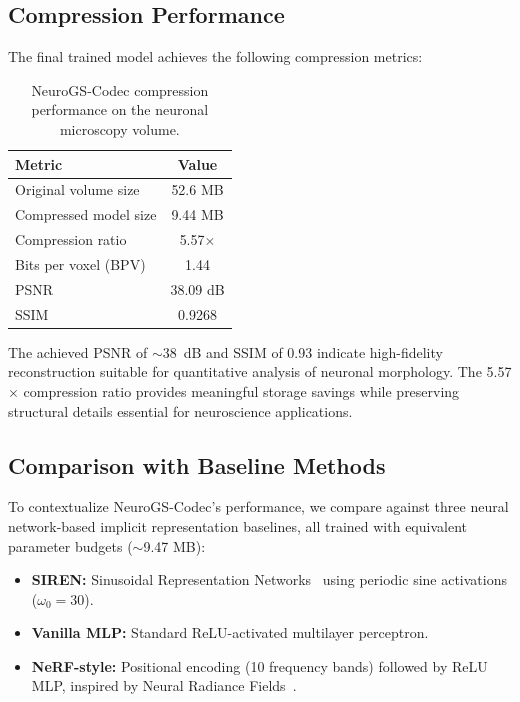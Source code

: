 \documentclass[11pt,a4paper]{article}
\begin{document}
\subsection{Compression Performance}
\label{subsec:compression}

The final trained model achieves the following compression metrics:

\begin{table}[htbp]
\centering
\caption{NeuroGS-Codec compression performance on the neuronal microscopy volume.}
\label{tab:compression}
\begin{tabular}{lc}
\toprule
\textbf{Metric} & \textbf{Value} \\
\midrule
Original volume size & 52.6 MB \\
Compressed model size & 9.44 MB \\
Compression ratio & 5.57$\times$ \\
Bits per voxel (BPV) & 1.44 \\
\midrule
PSNR & 38.09 dB \\
SSIM & 0.9268 \\
\bottomrule
\end{tabular}
\end{table}

The achieved PSNR of $\sim$38~dB and SSIM of 0.93 indicate high-fidelity reconstruction suitable for quantitative analysis of neuronal morphology. The 5.57$\times$ compression ratio provides meaningful storage savings while preserving structural details essential for neuroscience applications.

\subsection{Comparison with Baseline Methods}
\label{subsec:baseline_comparison}

To contextualize NeuroGS-Codec's performance, we compare against three neural network-based implicit representation baselines, all trained with equivalent parameter budgets ($\sim$9.47 MB):

\begin{itemize}
    \item \textbf{SIREN:} Sinusoidal Representation Networks~\cite{sitzmann2020siren} using periodic sine activations ($\omega_0=30$).
    \item \textbf{Vanilla MLP:} Standard ReLU-activated multilayer perceptron.
    \item \textbf{NeRF-style:} Positional encoding (10 frequency bands) followed by ReLU MLP, inspired by Neural Radiance Fields~\cite{mildenhall2020nerf}.
\end{itemize}
\end{document}
